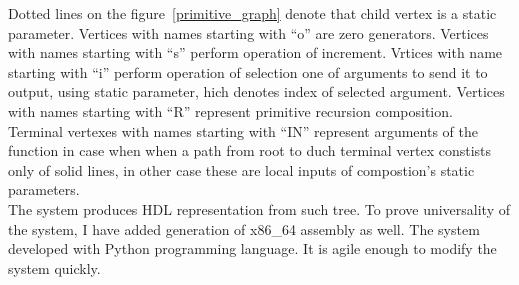 Dotted lines on the figure~\ref{primitive_graph} denote that child vertex is a static parameter. Vertices with names starting with ``o'' are zero generators. Vertices with names starting with ``s'' perform operation of increment. Vrtices with name starting with ``i'' perform operation of selection one of arguments to send it to output, using static parameter, hich denotes index of selected argument. Vertices with names starting with ``R'' represent primitive recursion composition. Terminal vertexes with names starting with ``IN'' represent arguments of the function in case when when a path from root to duch terminal vertex constists only of solid lines, in other case these are local inputs of compostion's static parameters.\\
The system produces HDL representation from such tree. To prove universality of the system, I have added generation of x86\_64 assembly as well. The system developed with Python programming language. It is agile enough to modify the system quickly.
